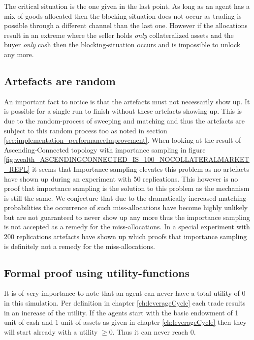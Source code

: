 \documentclass[Bachelorarbeit.tex]{subfiles}
\begin{document}
The critical situation is the one given in the last point. As long as an agent has a mix of goods allocated then the blocking situation does not occur as trading is possible through a different channel than the last one. However if the allocations result in an extreme where the seller holds \textit{only} collateralized assets and the buyer \textit{only} cash then the blocking-situation occurs and is impossible to unlock any more.

\subsection{Artefacts are random} An important fact to notice is that the artefacts must not necessarily show up. It is possible for a single run to finish without these artefacts showing up. This is due to the random-process of sweeping and matching and thus the artefacts are subject to this random process too as noted in section \ref{sec:implementation_performanceImprovement}. When looking at the result of Ascending-Connected topology with importance sampling in figure \ref{fig:wealth_ASCENDINGCONNECTED_IS_100_NOCOLLATERALMARKET_REPL} it seems that Importance sampling elevates this problem as no artefacts have shown up during an experiment with 50 replications. This however is no proof that importance sampling is the solution to this problem as the mechanism is still the same. We conjecture that due to the dramatically increased matching-probabilities the occurrence of such miss-allocations have become highly unlikely but are not guaranteed to never show up any more thus the importance sampling is not accepted as a remedy for the miss-allocations. In a special experiment with 200 replications artefacts have shown up which proofs that importance sampling is definitely not a remedy for the miss-allocations.

\subsection{Formal proof using utility-functions}
It is of very importance to note that an agent can never have a total utility of 0 in this simulation. Per definition in chapter \ref{ch:leverageCycle} each trade results in an increase of the utility. If the agents start with the basic endowment of 1 unit of cash and 1 unit of assets as given in chapter \ref{ch:leverageCycle} then they will start already with a utility $\geq 0$. Thus it can never reach 0.

\medskip
\end{document}

